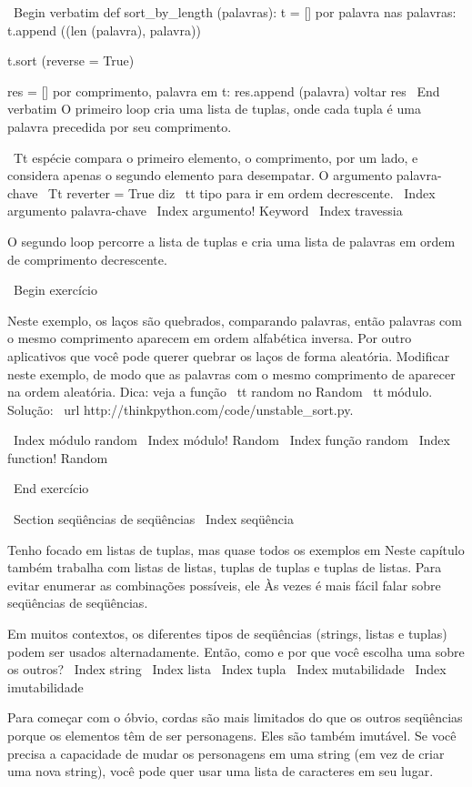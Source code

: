 \documentclass[10pt]{book}
\begin{document}
{{{{{{{{{\ Begin {verbatim}
def sort_by_length (palavras):
    t = []
    por palavra nas palavras:
       t.append ((len (palavra), palavra))

    t.sort (reverse = True)

    res = []
    por comprimento, palavra em t:
        res.append (palavra)
    voltar res
\ End {verbatim}
%
O primeiro loop cria uma lista de tuplas, onde cada
tupla é uma palavra precedida por seu comprimento.

{\ Tt espécie} compara o primeiro elemento, o comprimento, por um lado, e
considera apenas o segundo elemento para desempatar. O argumento palavra-chave
{\ Tt reverter = True} diz {\ tt tipo} para ir em ordem decrescente.
\ Index {argumento palavra-chave}
\ Index {argumento! Keyword}
\ Index {travessia}

O segundo loop percorre a lista de tuplas e cria uma lista de
palavras em ordem de comprimento decrescente.

\ Begin {} exercício

Neste exemplo, os laços são quebrados, comparando palavras, então palavras
com o mesmo comprimento aparecem em ordem alfabética inversa. Por outro
aplicativos que você pode querer quebrar os laços de forma aleatória. Modificar
neste exemplo, de modo que as palavras com o mesmo comprimento de aparecer na
ordem aleatória. Dica: veja a função {\ tt random} no
{Random \ tt} módulo.
Solução: \ url {http://thinkpython.com/code/unstable_sort.py}.

\ Index {módulo random}
\ Index {módulo! Random}
\ Index {função random}
\ Index {function! Random}

\ End {} exercício


\ Section {seqüências de seqüências}
\ Index {seqüência}

Tenho focado em listas de tuplas, mas quase todos os exemplos em
Neste capítulo também trabalha com listas de listas, tuplas de tuplas e
tuplas de listas. Para evitar enumerar as combinações possíveis, ele
Às vezes é mais fácil falar sobre seqüências de seqüências.

Em muitos contextos, os diferentes tipos de seqüências (strings, listas e
tuplas) podem ser usados ​​alternadamente. Então, como e por que você escolha uma
sobre os outros?
\ Index {string}
\ Index {lista}
\ Index {} tupla
\ Index {} mutabilidade
\ Index {imutabilidade}

Para começar com o óbvio, cordas são mais limitados do que os outros
seqüências porque os elementos têm de ser personagens. Eles são
também imutável. Se você precisa a capacidade de mudar os personagens
em uma string (em vez de criar uma nova string), você pode
quer usar uma lista de caracteres em seu lugar.

}}}}}}}}}
\end{document}
